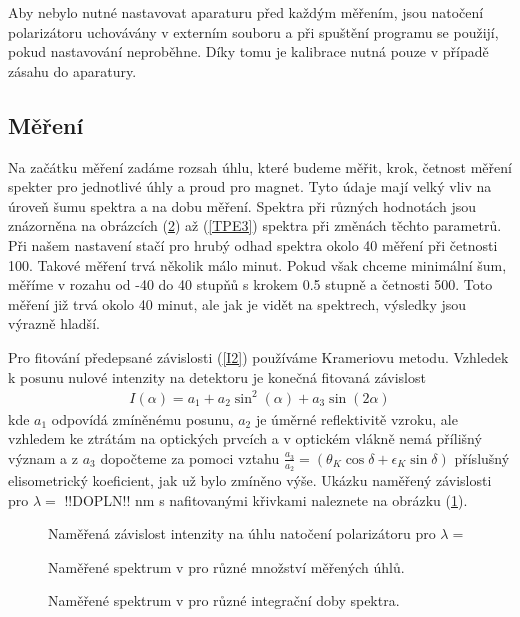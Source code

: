 Aby nebylo nutné nastavovat aparaturu před každým měřením, jsou natočení polarizátoru uchovávány v externím souboru a při spuštění programu se použijí, pokud nastavování neproběhne. Díky tomu je kalibrace nutná pouze v případě zásahu do aparatury. 


\subsection{Měření}
Na začátku měření zadáme rozsah úhlu, které budeme měřit, krok, četnost měření spekter pro jednotlivé úhly a proud pro magnet. Tyto údaje mají velký vliv na úroveň šumu spektra a na dobu měření. Spektra při různých hodnotách jsou znázorněna na obrázcích (\ref{TPE1}) až (\ref{TPE3}) spektra při změnách těchto parametrů. Při našem nastavení stačí pro hrubý odhad spektra okolo 40 měření při četnosti 100. Takové měření trvá několik málo minut. Pokud však chceme minimální šum, měříme v rozahu od -40 do 40 stupňů s krokem 0.5 stupně a četnosti 500. Toto měření již trvá okolo 40 minut, ale jak je vidět na spektrech, výsledky jsou výrazně hladší.

Pro fitování předepsané závislosti (\ref{I2}) používáme Krameriovu metodu. Vzhledek k posunu nulové intenzity na detektoru je konečná fitovaná závislost
\begin{eqnarray}
I(\alpha)=a_1+a_2\sin^2(\alpha)+a_3\sin(2\alpha)
\end{eqnarray}
kde $a_1$ odpovídá zmíněnému posunu, $a_2$ je úměrné reflektivitě vzroku, ale vzhledem ke ztrátám na optických prvcích a v optickém vlákně nemá přílišný význam a z $a_3$ dopočteme za pomoci vztahu $\frac{a_3}{a_2}=(\theta_K\cos\delta+\epsilon_K\sin\delta)$ příslušný elisometrický koeficient, jak už bylo zmíněno výše. Ukázku naměřený závislosti pro $\lambda=$ !!DOPLN!! nm s nafitovanými křivkami naleznete na obrázku (\ref{TPE0}).

\begin{figure}

\caption{Naměřená závislost intenzity na úhlu natočení polarizátoru pro $\lambda =$}
\label{TPE0}
\end{figure}

\begin{figure}

\caption{Naměřené spektrum v pro různé množství měřených úhlů.}
\label{TPE1}
\end{figure}

\begin{figure}

\caption{Naměřené spektrum v pro různé integrační doby spektra.}
\label{TPE2}
\end{figure}

